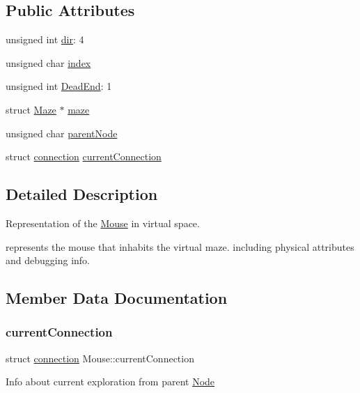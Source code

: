 \subsection*{Public Attributes}
\begin{DoxyCompactItemize}
\item 
unsigned int \hyperlink{structMouse_a6d4adc5b89ee69f33487e894e94b2640}{dir}\+: 4
\item 
unsigned char \hyperlink{structMouse_acdc68538ce06d1a8c134b359baf1ca54}{index}
\item 
unsigned int \hyperlink{structMouse_ad3d231b3da189659a15447dcb3e94fed}{Dead\+End}\+: 1
\item 
struct \hyperlink{structMaze}{Maze} $\ast$ \hyperlink{structMouse_ab8306542bdc35dfbbf53e734a364124e}{maze}
\item 
unsigned char \hyperlink{structMouse_ae6ac50ea4f691724ca55079ea4ddbd4b}{parent\+Node}
\item 
struct \hyperlink{structconnection}{connection} \hyperlink{structMouse_a63ce4210cb8aaec17760f2a0191aa42f}{current\+Connection}
\end{DoxyCompactItemize}


\subsection{Detailed Description}
Representation of the \hyperlink{structMouse}{Mouse} in virtual space. 

represents the mouse that inhabits the virtual maze. including physical attributes and debugging info. 

\subsection{Member Data Documentation}
\mbox{\label{structMouse_a63ce4210cb8aaec17760f2a0191aa42f}} 
\subsubsection{\texorpdfstring{current\+Connection}{currentConnection}}
{\footnotesize\ttfamily struct \hyperlink{structconnection}{connection} Mouse\+::current\+Connection}

Info about current exploration from parent \hyperlink{structNode}{Node} \mbox{\label{structMouse_ad3d231b3da189659a15447dcb3e94fed}} 
